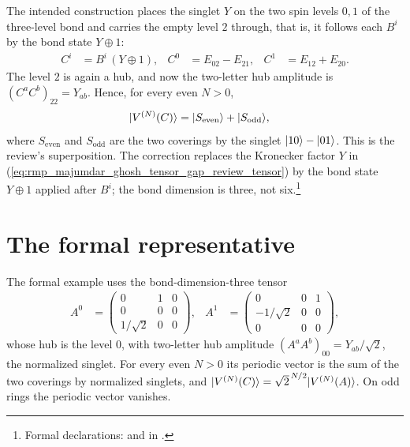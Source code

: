 \documentclass{article}
\begin{document}
The intended construction places the singlet $Y$ on the two spin levels $0,1$
of the three-level bond and carries the empty level $2$ through, that is, it
follows each $B^i$ by the bond state $Y\oplus1$:
\begin{align}
    C^i
        &=
        B^i\,(Y\oplus1),
    &
    C^0
        &=
        E_{02}-E_{21},
    &
    C^1
        &=
        E_{12}+E_{20}.
    \label{eq:rmp_majumdar_ghosh_tensor_gap_corrected_tensor}
\end{align}
The level $2$ is again a hub, and now the two-letter hub amplitude is
$(C^aC^b)_{22}=Y_{ab}$. Hence, for every even $N>0$,
\begin{align}
    |V^{(N)}(C)\rangle
        &=
        |S_{\mathrm{even}}\rangle+|S_{\mathrm{odd}}\rangle,
    \label{eq:rmp_majumdar_ghosh_tensor_gap_corrected_vector}
\end{align}
where $S_{\mathrm{even}}$ and $S_{\mathrm{odd}}$ are the two coverings by the
singlet $|10\rangle-|01\rangle$. This is the review's superposition. The
correction replaces the Kronecker factor $Y$ in
(\ref{eq:rmp_majumdar_ghosh_tensor_gap_review_tensor}) by the bond state
$Y\oplus1$ applied after $B^i$; the bond dimension is three, not
six.\footnote{Formal declarations:
 and
 in
.}

\section{The formal representative}

The formal example uses the bond-dimension-three tensor
\begin{align}
    A^0
        &=
        \begin{pmatrix}
            0 & 1 & 0\\
            0 & 0 & 0\\
            1/\sqrt{2} & 0 & 0
        \end{pmatrix},
    &
    A^1
        &=
        \begin{pmatrix}
            0 & 0 & 1\\
            -1/\sqrt{2} & 0 & 0\\
            0 & 0 & 0
        \end{pmatrix},
    \label{eq:rmp_majumdar_ghosh_tensor_gap_formal_matrices}
\end{align}
whose hub is the level $0$, with two-letter hub amplitude
$(A^aA^b)_{00}=Y_{ab}/\sqrt2$, the normalized singlet. For every even $N>0$
its periodic vector is the sum of the two coverings by normalized singlets,
and $|V^{(N)}(C)\rangle=\sqrt2^{\,N/2}|V^{(N)}(A)\rangle$. On odd rings the
periodic vector vanishes.
\end{document}
